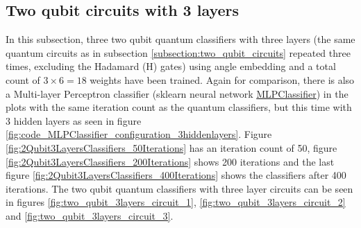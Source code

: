 \clearpage
\subsection{Two qubit circuits with 3 layers}
\label{subsection:two_qubit_circuits_3layers}

In this subsection, three two qubit quantum classifiers with three layers (the same quantum circuits as in subsection \ref{subsection:two_qubit_circuits} repeated three times, excluding the Hadamard ($\mathrm{H}$) gates) using angle embedding and a total count of $3\times6 = 18$ weights have been trained. Again for comparison, there is also a Multi-layer Perceptron classifier (sklearn neural network \href{https://scikit-learn.org/stable/modules/generated/sklearn.neural_network.MLPClassifier.html}{MLPClassifier}) in the plots with the same iteration count as the quantum classifiers, but this time with 3 hidden layers as seen in figure \ref{fig:code_MLPClassifier_configuration_3hiddenlayers}. Figure \ref{fig:2Qubit3LayersClassifiers_50Iterations} has an iteration count of 50, figure \ref{fig:2Qubit3LayersClassifiers_200Iterations} shows 200 iterations and the last figure \ref{fig:2Qubit3LayersClassifiers_400Iterations} shows the classifiers after 400 iterations. The two qubit quantum classifiers with three layer circuits can be seen in figures \ref{fig:two_qubit_3layers_circuit_1}, \ref{fig:two_qubit_3layers_circuit_2} and \ref{fig:two_qubit_3layers_circuit_3}.\\

\hfill \break

